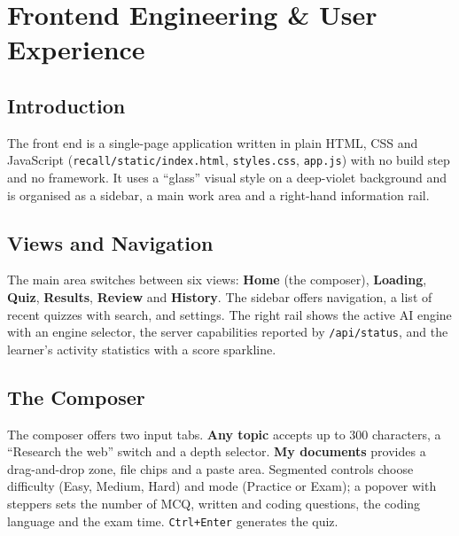 \chapter{Frontend Engineering \& User Experience}

\section{Introduction}
The front end is a single-page application written in plain HTML, CSS and JavaScript (\texttt{recall/static/index.html}, \texttt{styles.css}, \texttt{app.js}) with no build step and no framework. It uses a ``glass'' visual style on a deep-violet background and is organised as a sidebar, a main work area and a right-hand information rail.

\section{Views and Navigation}
The main area switches between six views: \textbf{Home} (the composer), \textbf{Loading}, \textbf{Quiz}, \textbf{Results}, \textbf{Review} and \textbf{History}. The sidebar offers navigation, a list of recent quizzes with search, and settings. The right rail shows the active AI engine with an engine selector, the server capabilities reported by \texttt{/api/status}, and the learner's activity statistics with a score sparkline.


\section{The Composer}
The composer offers two input tabs. \textbf{Any topic} accepts up to 300 characters, a ``Research the web'' switch and a depth selector. \textbf{My documents} provides a drag-and-drop zone, file chips and a paste area. Segmented controls choose difficulty (Easy, Medium, Hard) and mode (Practice or Exam); a popover with steppers sets the number of MCQ, written and coding questions, the coding language and the exam time. \texttt{Ctrl+Enter} generates the quiz.


